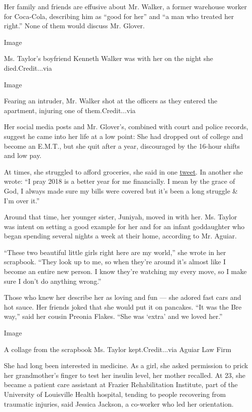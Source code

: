 Her family and friends are effusive about Mr. Walker, a former warehouse
worker for Coca-Cola, describing him as ``good for her'' and ``a man who
treated her right.'' None of them would discuss Mr. Glover.

Image

Ms. Taylor's boyfriend Kenneth Walker was with her on the night she
died.Credit...via

Image

Fearing an intruder, Mr. Walker shot at the officers as they entered the
apartment, injuring one of them.Credit...via

Her social media posts and Mr. Glover's, combined with court and police
records, suggest he came into her life at a low point: She had dropped
out of college and become an E.M.T., but she quit after a year,
discouraged by the 16-hour shifts and low pay.

At times, she struggled to afford groceries, she said in one
\href{https://twitter.com/PrettyN_Paidd/status/1205144818101473280}{tweet}.
In another she wrote: ``I pray 2018 is a better year for me financially.
I mean by the grace of God, I always made sure my bills were covered but
it's been a long struggle \& I'm over it.''

Around that time, her younger sister, Juniyah, moved in with her. Ms.
Taylor was intent on setting a good example for her and for an infant
goddaughter who began spending several nights a week at their home,
according to Mr. Aguiar.

``These two beautiful little girls right here are my world,'' she wrote
in her scrapbook. ``They look up to me, so when they're around it's
almost like I become an entire new person. I know they're watching my
every move, so I make sure I don't do anything wrong.''

Those who knew her describe her as loving and fun --- she adored fast
cars and hot sauce. Her friends joked that she would put it on pancakes.
``It was the Bre way,'' said her cousin Preonia Flakes. ``She was
`extra' and we loved her.''

Image

A collage from the scrapbook Ms. Taylor kept.Credit...via Aguiar Law
Firm

She had long been interested in medicine. As a girl, she asked
permission to prick her grandmother's finger to test her insulin level,
her mother recalled. At 23, she became a patient care assistant at
Frazier Rehabilitation Institute, part of the University of Louisville
Health hospital, tending to people recovering from traumatic injuries,
said Jessica Jackson, a co-worker who led her orientation.

